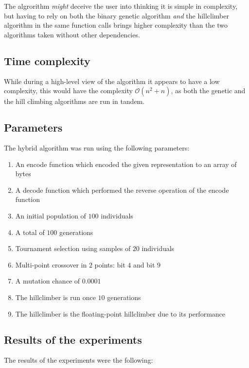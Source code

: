 \documentclass[conference]{IEEEtran}
\begin{document}
The algrorithm \textit{might} deceive the user into thinking it is simple in complexity, but having to rely on both the binary genetic
algorithm \textit{and} the hillclimber algorithm in the same function calls brings higher complexity than the two algorithms
taken without other dependencies.

\subsection{Time complexity}
While during a high-level view of the algorithm it appears to have a low complexity, this would have the complexity
$\mathcal{O}(n^2 + n)$, as both the genetic and the hill climbing algorithms are run in tandem.

\subsection{Parameters}
The hybrid algorithm was run using the following parameters:

\begin{enumerate}
    \item An encode function which encoded the given representation to an array of bytes
    \item A decode function which performed the reverse operation of the encode function
    \item An initial population of $100$ individuals
    \item A total of $100$ generations
    \item Tournament selection using samples of $20$ individuals
    \item Multi-point crossover in $2$ points: bit $4$ and bit $9$
    \item A mutation chance of $0.0001$
    \item The hillclimber is run once $10$ generations
    \item The hillclimber is the floating-point hillclimber due to its performance
\end{enumerate}

\subsection{Results of the experiments}
The results of the experiments were the following:
\end{document}
